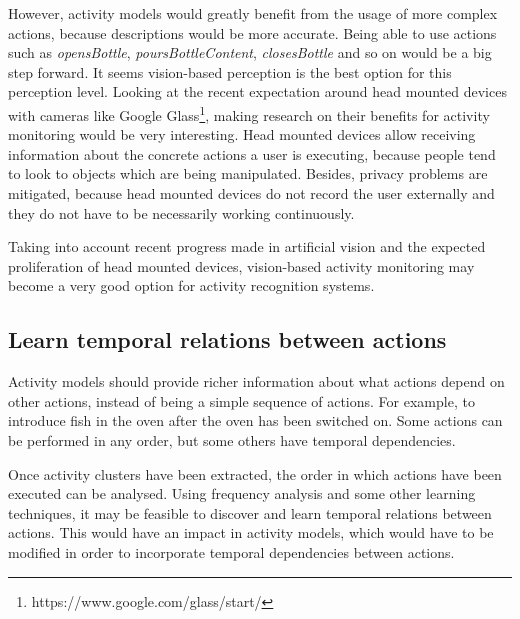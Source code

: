 However, activity models would greatly benefit from the usage of more complex actions, because descriptions would be more accurate. Being able to use actions such as \textit{opensBottle}, \textit{poursBottleContent}, \textit{closesBottle} and so on would be a big step forward. It seems vision-based perception is the best option for this perception level. Looking at the recent expectation around head mounted devices with cameras like Google Glass\footnote{https://www.google.com/glass/start/}, making research on their benefits for activity monitoring would be very interesting. Head mounted devices allow receiving information about the concrete actions a user is executing, because people tend to look to objects which are being manipulated. Besides, privacy problems are mitigated, because head mounted devices do not record the user externally and they do not have to be necessarily working continuously. 

Taking into account recent progress made in artificial vision and the expected proliferation of head mounted devices, vision-based activity monitoring may become a very good option for activity recognition systems.

\subsection{Learn temporal relations between actions}

Activity models should provide richer information about what actions depend on other actions, instead of being a simple sequence of actions. For example, to introduce fish in the oven after the oven has been switched on. Some actions can be performed in any order, but some others have temporal dependencies.

Once activity clusters have been extracted, the order in which actions have been executed can be analysed. Using frequency analysis and some other learning techniques, it may be feasible to discover and learn temporal relations between actions. This would have an impact in activity models, which would have to be modified in order to incorporate temporal dependencies between actions. 
